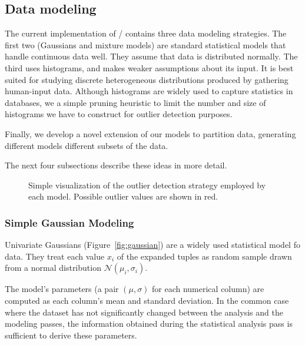 \subsection{Data modeling}
\label{sec:model-creation}

The current implementation of \dBoost/ contains three data modeling strategies. The first two (Gaussians and mixture models) are standard statistical models that handle  continuous data well.
They assume that data is distributed normally.
The third uses histograms, and makes weaker assumptions about its input.  It is best suited for studying discrete heterogeneous distributions produced by gathering human-input data.  Although histograms are widely used to capture statistics in databases, we a simple pruning heuristic to limit the number and size of histograms we have to construct for outlier detection purposes.

Finally, we develop a novel extension of our models to partition data, generating different models different subsets of the data.

The next four subsections describe these ideas in more detail.

\begin{figure}
  \centering
  \newcommand{\cramped}[3]{\subfloat[#2]{\texttt{[image: \#1]}\label{fig:#3}}}
  \cramped{../../graphics/gaussians-preview.pdf}{Gaussian}{gaussian}\hspace*{.01\linewidth}
  \cramped{../../graphics/mixtures-preview.png}{Mixture}{mixture}\hspace*{.01\linewidth}
  \cramped{../../graphics/histograms-preview.pdf}{Histogram}{histogram}
  \caption{Simple visualization of the outlier detection strategy employed by each model. Possible outlier values are shown in red.}
  \label{fig:models}
\end{figure}


\subsubsection{Simple Gaussian Modeling}
\label{sec:gaus_model}
Univariate Gaussians (Figure~\ref{fig:gaussian}) are a widely used statistical model fo data.  They treat each value $x_i$ of the expanded tuples as random sample drawn from a normal distribution $\mathcal N(\mu_i, \sigma_i)$.

The model's parameters (a pair $(\mu, \sigma)$ for each numerical column) are computed as each column's mean and standard deviation. In the common case where the dataset has not significantly changed between the analysis and the modeling passes, the information obtained during the statistical analysis pass is sufficient to derive these parameters.

